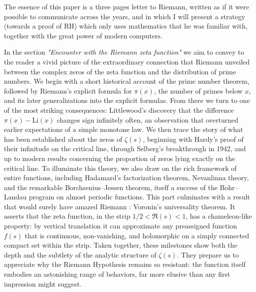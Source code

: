 \documentclass{article}
\begin{document}
\medskip

The essence of this paper is a three pages letter to Riemann, written as if it were possible to communicate across the years, and in which I will present a strategy (towards a proof of RH) which only uses mathematics that he was familiar with, together with the great power of modern computers.

\medskip


   
   In the section \textit{"Encounter with the Riemann zeta function"} we aim to convey to the reader a vivid picture of the extraordinary connection that Riemann unveiled between the complex zeros of the zeta function and the distribution of prime numbers. We begin with a short historical account of the prime number theorem, followed by Riemann’s explicit formula for $\pi(x)$, the number of primes below $x$, and its later generalizations into the  explicit formulas. From there we turn to one of the most striking consequences: Littlewood’s discovery that the difference $\pi(x)-\mathrm{Li}(x)$ changes sign infinitely often, an observation that overturned earlier expectations of a simple monotone law.\newline
We then trace the story of what has been established about the zeros of $\zeta(s)$, beginning with Hardy’s proof of their infinitude on the critical line, through Selberg’s breakthrough in 1942, and up to modern results concerning the proportion of zeros lying exactly on the critical line. To illuminate this theory, we also draw on the rich framework of entire functions, including Hadamard’s factorization theorem, Nevanlinna theory, and the remarkable Borchsenius--Jessen theorem, itself a success of the Bohr--Landau program on almost periodic functions.\newline
This part culminates with a result that would surely have amazed Riemann : Voronin’s universality theorem. It asserts that the zeta function, in the strip $1/2 < \Re(s) < 1$, has a chameleon-like property: by vertical translation it can approximate any preassigned function $f(s)$ that is continuous, non-vanishing, and holomorphic on a simply connected compact set within the strip.\newline
Taken together, these milestones show both the depth and the subtlety of the analytic structure of $\zeta(s)$. They prepare us to appreciate why the Riemann Hypothesis remains so resistant: the function itself embodies an astonishing range of behaviors, far more elusive than any first impression might suggest.\newline
\end{document}
